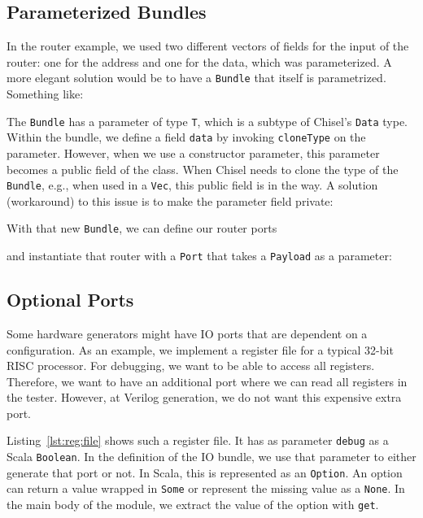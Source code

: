 \documentclass[%
    10pt,
    headinclude, footinclude=false,
    openright, %
    notitlepage,
    cleardoublepage=empty,
    headsepline,
    numbers=noenddot,
    bibliography=totoc, index=totoc,
    ]{scrbook}
\newcommand{\code}[1]{{\lstinline[basicstyle=\small\ttfamily]{#1}}}
\begin{document}

\subsection{Parameterized Bundles}

In the router example, we used two different vectors of fields for the input
of the router: one for the address and one for the data, which was parameterized.
A more elegant solution would be to have a \code{Bundle} that itself
is parametrized. Something like:


The \code{Bundle} has a parameter of type \code{T}, which is a subtype
of Chisel's \code{Data} type.
Within the bundle, we define a field \code{data} by invoking \code{cloneType}
on the parameter.
However, when we use a constructor parameter, this parameter becomes a
public field of the class. When Chisel needs to clone the type of the \code{Bundle},
e.g., when used in a \code{Vec}, this public field is in the way.
A solution (workaround) to this issue is to make the parameter field private:


\noindent With that new \code{Bundle}, we can define our router ports


\noindent and instantiate that router with a \code{Port} that takes
a \code{Payload} as a parameter:


\subsection{Optional Ports}

Some hardware generators might have IO ports that are dependent on a configuration.
As an example, we implement a register file for a typical 32-bit RISC processor. For debugging,
we want to be able to access all registers. Therefore, we want to have an additional
port where we can read all registers in the tester. However, at Verilog generation,
we do not want this expensive extra port.

Listing~\ref{lst:reg:file} shows such a register file. It has as parameter \code{debug}
as a Scala \code{Boolean}. In the definition of the IO bundle, we use that parameter
to either generate that port or not. In Scala, this is represented as an \code{Option}.
An option can return a value wrapped in \code{Some} or represent the missing value
as a \code{None}. In the main body of the module, we extract the value of the option
with \code{get}.
\end{document}

